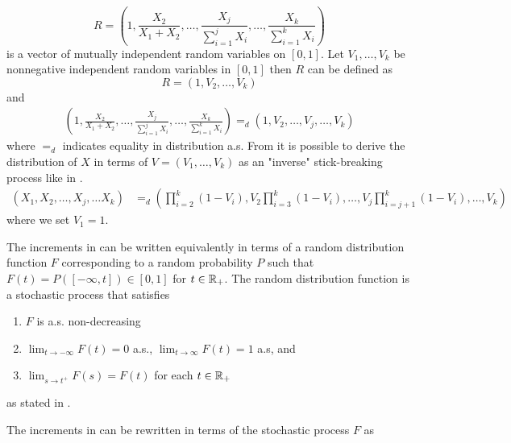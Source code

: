 \begin{equation*}
R = \left(1, \frac{X_2}{X_1 + X_2}, \ldots, \frac{X_j}{\sum_{i=1}^j X_i}, \ldots, \frac{X_k}{\sum_{i=1}^k X_i}\right)
\end{equation*}
is a vector of mutually independent random variables on $[0,1]$. Let $V_1, \ldots, V_k$ be nonnegative independent random variables in $[0, 1]$ then $R$ can be defined as
\begin{equation*}
R = \left(1, V_2, \ldots, V_k\right)
\end{equation*}
and 
\begin{equation}\label{increments_v}
\begin{split}
\left(1, \frac{X_2}{X_1 + X_2}, \ldots, \frac{X_j}{\sum_{i=1}^j X_i}, \ldots, \frac{X_k}{\sum_{i=1}^k X_i}\right) =_d \left(1, V_2, \ldots,V_j, \ldots, V_k\right)
\end{split}
\end{equation}
where $=_d$ indicates equality in distribution a.s. From  it is possible to derive the distribution of $X$ in terms of $V = (V_1, \ldots, V_k)$ as an "inverse" stick-breaking process like in \cite{bloem2017preferential}.
\begin{equation*}
\begin{split}
(X_1, X_2, \ldots,X_j, \ldots X_k) &=_d \left(\prod_{i=2}^k(1-V_i), V_2\prod_{i=3}^k(1-V_i), \ldots, V_j\prod_{i=j+1}^k(1-V_i), \ldots, V_k\right)
\end{split}
\end{equation*}
where we set $V_1 = 1$.

The increments in  can be written equivalently in terms of a random distribution function $F$ corresponding to a random probability $P$ such that $F(t) = P([-\infty, t]) \in [0, 1]$ for $t \in \mathbb{R}_{+}$. The random distribution function is a stochastic process that satisfies

\begin{enumerate}
	\item $F$ is a.s. non-decreasing
	\item $\lim_{t \rightarrow - \infty} F(t) = 0$ a.s., $\lim_{t \rightarrow \infty} F(t) = 1$ a.s, and
	\item $\lim_{s \rightarrow t^+} F(s) = F(t)$ for each $t \in \mathbb{R}_{+}$
\end{enumerate}
as stated in \cite{doksum1974tailfree}.

The increments in  can be rewritten in terms of the stochastic process $F$ as

